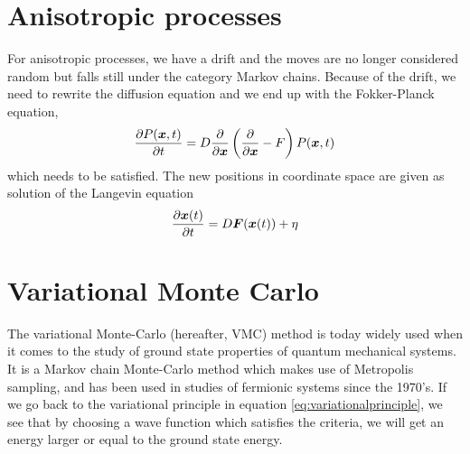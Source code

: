 \section{Anisotropic processes}
For anisotropic processes, we have a drift and the moves are no longer considered random but falls still under the category Markov chains. Because of the drift, we need to rewrite the diffusion equation and we end up with the Fokker-Planck equation,
\begin{equation}
\frac{\partial P(\boldsymbol{{x}},t)}{\partial t}=D\frac{\partial}{\partial \boldsymbol{{x}}}\left(\frac{\partial}{\partial \boldsymbol{{x}}}-F\right)P(\boldsymbol{{x}},t)
\end{equation}
which needs to be satisfied. The new positions in coordinate space are given as solution of the Langevin equation 
\begin{equation}
\frac{\partial \boldsymbol{{x}}(t)}{\partial t}=D\boldsymbol{{F}}(\boldsymbol{{x}}(t))+\eta
\end{equation}

\section{Variational Monte Carlo} \label{subsec:vmc}
The variational Monte-Carlo (hereafter, VMC) method is today widely used when it comes to the study of ground state properties of quantum mechanical systems. It is a Markov chain Monte-Carlo method which makes use of Metropolis sampling, and has been used in studies of fermionic systems since the 1970's. \cite{deb_variational_2014} If we go back to the variational principle in equation \eqref{eq:variationalprinciple}, we see that by choosing a wave function which satisfies the criteria, we will get an energy larger or equal to the ground state energy. \bigskip

